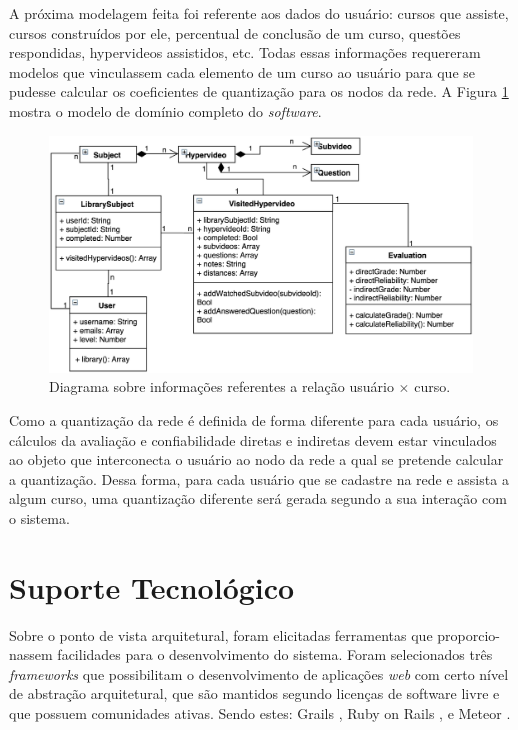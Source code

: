 A próxima modelagem feita foi referente aos dados do usuário: cursos que assiste, cursos construídos por ele, percentual de conclusão de um curso, questões respondidas, hypervideos assistidos, etc. Todas essas informações requereram modelos que vinculassem cada elemento de um curso ao usuário para que se pudesse calcular os coeficientes de quantização para os nodos da rede. A Figura \ref{fig:userdata} mostra o modelo de domínio completo do \textit{software}.

\begin{figure}[h!]
	\centering
  	\includegraphics[width=.8\linewidth]{figuras/userdata.eps}
  	\caption{Diagrama sobre informações referentes a relação usuário \(\times\) curso.}
  	\label{fig:userdata}
\end{figure}

Como a quantização da rede é definida de forma diferente para cada usuário, os cálculos da avaliação e confiabilidade diretas e indiretas devem estar vinculados ao objeto que interconecta o usuário ao nodo da rede a qual se pretende calcular a quantização. Dessa forma, para cada usuário que se cadastre na rede e assista a algum curso, uma quantização diferente será gerada segundo a sua interação com o sistema.

\section{Suporte Tecnológico}

Sobre o ponto de vista arquitetural, foram elicitadas ferramentas que proporcio- nassem facilidades para o desenvolvimento do sistema. Foram selecionados três \textit{frameworks} que possibilitam o desenvolvimento de aplicações \textit{web} com certo nível de abstração arquitetural, que são mantidos segundo licenças de software livre e que possuem comunidades ativas. Sendo estes: Grails \cite{grails2015}, Ruby on Rails \cite{rubyrails2015}, e Meteor \cite{meteor2015}. 

